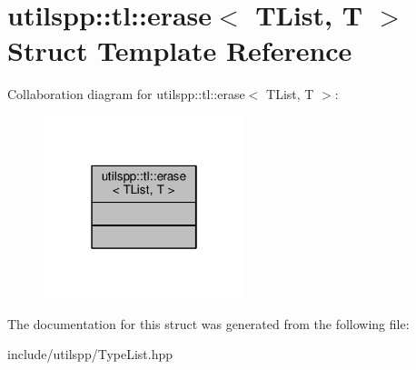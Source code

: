 \hypertarget{structutilspp_1_1tl_1_1erase}{\section{utilspp\-:\-:tl\-:\-:erase$<$ T\-List, T $>$ Struct Template Reference}
\label{structutilspp_1_1tl_1_1erase}
}


Collaboration diagram for utilspp\-:\-:tl\-:\-:erase$<$ T\-List, T $>$\-:\nopagebreak
\begin{figure}[H]
\begin{center}
\leavevmode
\includegraphics[width=166pt]{structutilspp_1_1tl_1_1erase__coll__graph}
\end{center}
\end{figure}


The documentation for this struct was generated from the following file\-:\begin{DoxyCompactItemize}
\item 
include/utilspp/Type\-List.\-hpp\end{DoxyCompactItemize}
